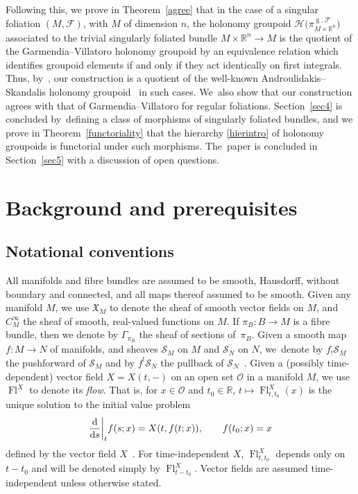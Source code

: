 \documentclass[10pt,a4paper]{amsart}
\numberwithin{equation}{section}
\def\g{\operatorname{g}}
\def\Fl{\operatorname{Fl}}
\def\FF{{\mathcal{F}}}
\def\HH{{\mathcal{H}}}
\def\OO{{\mathcal{O}}}
\def\SS{{\mathscr{S}}}
\def\RB{{\mathbb{R}}}
\def\XF{{\mathfrak{X}}}
\begin{document}
Following this, we prove in Theorem~\ref{agree} that in the case of a singular foliation $(M,\FF)$, with $M$ of dimension $n$, the holonomy groupoid $\HH\big(\pi_{M\times\RB^{n}}^{\g,\FF}\big)$ associated to the trivial singularly foliated bundle $M\times\RB^{n}\rightarrow M$ is the quotient of the Garmendia--Villatoro holonomy groupoid by an equivalence relation which identifies groupoid elements if and only if they act identically on first integrals. Thus, by~\cite[Theorem~5.5]{VilGar1}, our construction is a quotient of the well-known Androulidakis--Skandalis holonomy groupoid~\cite{iakovos2} in such cases. We~also show that our construction agrees with that of Garmendia--Villatoro for regular foliations. Section~\ref{sec4} is concluded by~defining a class of morphisms of singularly foliated bundles, and we prove in Theorem~\ref{functoriality} that the hierarchy \eqref{hierintro} of holonomy groupoids is functorial under such morphisms. The~paper is concluded in Section~\ref{sec5} with a discussion of open questions.

\section{Background and prerequisites}\label{sec2}

\subsection{Notational conventions}

All manifolds and fibre bundles are assumed to be smooth, Hausdorff, without boundary and connected, and all maps thereof assumed to be smooth. Given any manifold $M$, we use $\XF_{M}$ to denote the sheaf of smooth vector fields on $M$, and $C^{\infty}_{M}$ the sheaf of smooth, real-valued functions on $M$. If $\pi_{B}\colon B\rightarrow M$ is a fibre bundle, then we denote by $\Gamma_{\pi_{B}}$ the sheaf of sections of~$\pi_{B}$. Given a smooth map $f\colon M\rightarrow N$ of manifolds, and sheaves $\SS_{M}$ on $M$ and $\SS_{N}$ on $N$, we~denote by $f_{!}\SS_{M}$ the pushforward of $\SS_{M}$ and by $f^{!}\SS_{N}$ the pullback of $\SS_{N}$~\cite[p.~65]{hartshorne}. Given a (possibly time-dependent) vector field $X = X(t,-)$ on an open set $\OO$ in a manifold $M$, we use $\Fl^{X}$ to denote its \textit{flow}. That is, for $x\in\OO$ and $t_{0}\in\RB$, $t\mapsto\Fl^{X}_{t,t_{0}}(x)$ is the unique solution to the initial value problem
\begin{gather*}
\frac{\rm d}{{\rm d}s}\bigg|_{t}f(s;x) = X(t,f(t;x)),\qquad f(t_{0};x) = x
\end{gather*}
defined by the vector field $X$~\cite[p.~236]{leesmth}. For time-independent $X$, $\Fl^{X}_{t,t_{0}}$ depends only on $t-t_{0}$ and will be denoted simply by $\Fl^{X}_{t-t_{0}}$. Vector fields are assumed time-independent unless otherwise stated.
\end{document}
